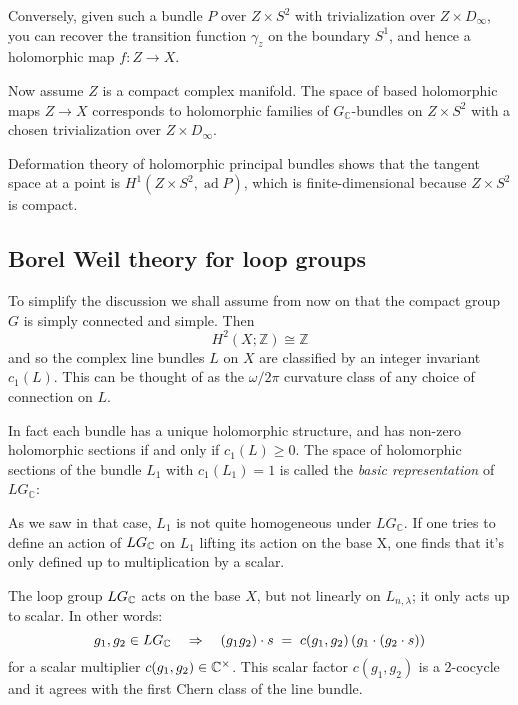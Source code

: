 \documentclass[12pt]{article}
\begin{document}
\begin{remark}
    Conversely, given such a bundle $P$ over $Z \times S^2$ with trivialization over $Z \times D_\infty$, you can recover the transition function $\gamma_z$ on the boundary $S^1$, and hence a holomorphic map $f: Z \to X$. 

    Now assume $Z$ is a compact complex manifold. The space of based holomorphic maps $Z \to X$ corresponds to holomorphic families of $G_\mathbb{C}$-bundles on $Z \times S^2$ with a chosen trivialization over $Z \times D_\infty$.

     Deformation theory of holomorphic principal bundles shows that the tangent space at a point is $H^1(Z \times S^2, \operatorname{ad} P)$, which is finite-dimensional because $Z \times S^2$ is compact.
\end{remark}
\subsection{Borel Weil theory for loop groups}
To simplify the discussion we shall assume from now on that the compact group \(G\) is simply connected and simple.
Then \[H^2(X;\mathbb{Z}) \cong \mathbb{Z}\]
and so the complex line bundles \(L\) on \(X\) are classified by an integer invariant \(c_1(L)\). This can be thought of as the $\omega/2\pi$ curvature class of any choice of connection on \(L\).

In fact each bundle has a unique holomorphic structure,
and has non-zero holomorphic sections if and only if \(c_1(L) \ge 0\).
The space of holomorphic sections of the bundle \(L_1\) with \(c_1(L_1) = 1\)
is called the \emph{basic representation} of \(LG_{\mathbb{C}}\):


As we saw in that case, \(L_1\) is not quite homogeneous under \(LG_{\mathbb{C}}\). If one tries to define an action of \(LG_{\mathbb{C}}\) on $L_1$ lifting its action on the base X, one finds that it's only defined up to multiplication by a scalar.

The loop group \(LG_{\mathbb{C}}\) acts on the base $X$, but not linearly on \(L_{n,\lambda}\); it only acts up to scalar.
In other words:
\[
g_1,g_2 \in LG_{\mathbb{C}}
\quad \Rightarrow \quad
(g_1g_2)\cdot s
\;=\;
c(g_1,g_2)\,(g_1\cdot(g_2\cdot s))
\]
for a scalar multiplier \(c(g_1,g_2) \in \mathbb{C}^\times\). This scalar factor $c(g_1,g_2)$ is a 2-cocycle and it agrees with the first Chern class of the line bundle.
\end{document}
